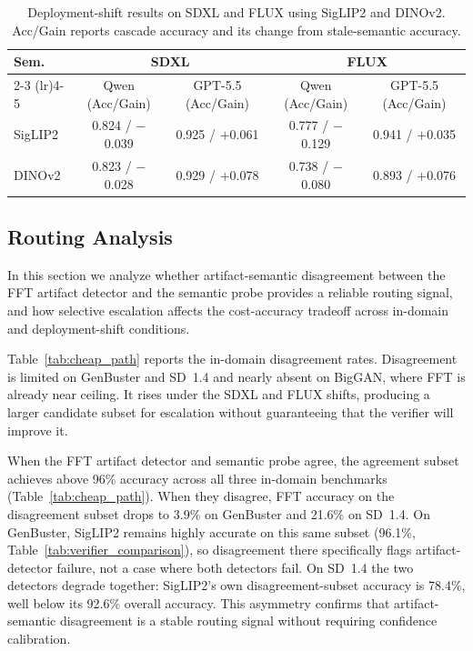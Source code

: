 \documentclass{ieeeaccess}
\begin{document}
\begin{table}[t]
\centering
\footnotesize
\setlength{\tabcolsep}{3pt}
\caption{Deployment-shift results on SDXL and FLUX using SigLIP2 and DINOv2. Acc/Gain reports cascade accuracy and its change from stale-semantic accuracy.}
\label{tab:e8_results}
\begin{tabular}{lcccc}
\toprule
Sem. & \multicolumn{2}{c}{SDXL} & \multicolumn{2}{c}{FLUX} \\
\cmidrule(lr){2-3} \cmidrule(lr){4-5}
 & Qwen (Acc/Gain) & GPT-5.5 (Acc/Gain) & Qwen (Acc/Gain) & GPT-5.5 (Acc/Gain) \\
\midrule
SigLIP2 & 0.824 / $-$0.039 & 0.925 / $+$0.061 & 0.777 / $-$0.129 & 0.941 / $+$0.035 \\
DINOv2  & 0.823 / $-$0.028 & 0.929 / $+$0.078 & 0.738 / $-$0.080 & 0.893 / $+$0.076 \\
\bottomrule
\end{tabular}
\end{table}


\subsection{Routing Analysis}

In this section we analyze whether artifact-semantic disagreement between the FFT artifact detector and
the semantic probe provides a reliable routing signal, and how selective escalation
affects the cost-accuracy tradeoff across in-domain and deployment-shift conditions.

Table~\ref{tab:cheap_path} reports the in-domain disagreement rates. Disagreement is
limited on GenBuster and SD~1.4 and nearly absent on BigGAN, where FFT is already near
ceiling. It rises under the SDXL and FLUX shifts, producing a larger candidate subset
for escalation without guaranteeing that the verifier will improve it.

When the FFT artifact detector and semantic probe agree, the agreement subset achieves
above 96\% accuracy across all three in-domain benchmarks (Table~\ref{tab:cheap_path}).
When they disagree, FFT accuracy on the disagreement subset drops to
3.9\% on GenBuster and 21.6\% on SD~1.4. On GenBuster, SigLIP2 remains
highly accurate on this same subset (96.1\%, Table~\ref{tab:verifier_comparison}),
so disagreement there specifically flags artifact-detector failure, not
a case where both detectors fail. On SD~1.4 the two detectors degrade
together: SigLIP2's own disagreement-subset accuracy is 78.4\%, well
below its 92.6\% overall accuracy. This asymmetry
confirms that artifact-semantic disagreement is a stable routing signal without requiring
confidence calibration.
\end{document}
